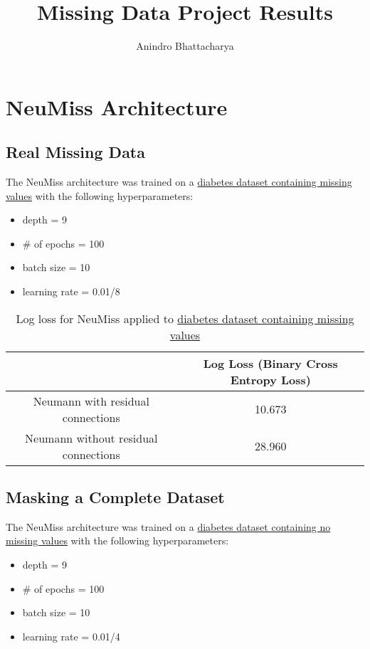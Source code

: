 \documentclass{article}
\title{Missing Data Project Results}
\author{Anindro Bhattacharya }
\begin{document}
\maketitle

\section{NeuMiss Architecture}
\subsection{Real Missing Data}

The NeuMiss architecture was trained on a \href{https://www.kaggle.com/mathchi/diabetes-data-set/version/1}{diabetes dataset containing missing values} with the following hyperparameters:
\begin{itemize}
  \item depth = 9
  \item \# of epochs = 100
  \item batch size = 10
  \item learning rate = 0.01/8
\end{itemize}

\begin{table}[h!]
\centering
\begin{tabular}{|c| c|} 
 \hline
  & Log Loss (Binary Cross Entropy Loss) \\ [0.5ex]
 \hline 
 Neumann with residual connections & 10.673 \\ 
 Neumann without residual connections & 28.960 \\
 [1ex] 
 \hline
\end{tabular}
\caption{Log loss for NeuMiss applied to \href{https://www.kaggle.com/mathchi/diabetes-data-set/version/1}{diabetes dataset containing missing values}}
\label{table:1}
\end{table}

\subsection{Masking a Complete Dataset}
The NeuMiss architecture was trained on a \href{https://www.kaggle.com/homayoonkhadivi/ai-for-medical-prognosis-diabetes-datasets?select=y_data.csv}{diabetes dataset containing no missing values} with the following hyperparameters:

\begin{itemize}
  \item depth = 9
  \item \# of epochs = 100
  \item batch size = 10
  \item learning rate = 0.01/4
\end{itemize}
\end{document}

